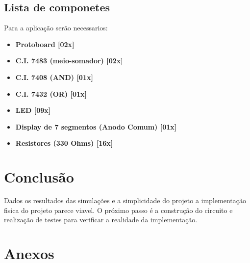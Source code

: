 \documentclass[11pt]{report}         %
\begin{document}
\section{Lista de componetes}

Para a aplicação serão necessarios:

\begin{itemize}

\item \textbf{Protoboard [02x]}
\item \textbf{C.I. 7483 (meio-somador) [02x]}
\item \textbf{C.I. 7408 (AND) [01x]}
\item \textbf{C.I. 7432 (OR) [01x]}
\item \textbf{LED [09x]}
\item \textbf{Display de 7 segmentos (Anodo Comum) [01x]}
\item \textbf{Resistores (330 Ohms) [16x]}

\end{itemize}

\chapter{Conclusão}

Dados os resultados das simulações e a simplicidade do projeto a implementação fisica do projeto parece viavel. O próximo passo é a construção 
do circuito e realização de testes para verificar a realidade da implementação.

\chapter {Anexos}


\end{document}

